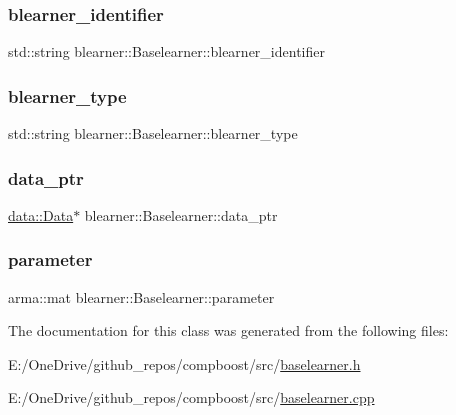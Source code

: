 \subsubsection{\texorpdfstring{blearner\+\_\+identifier}{blearner\_identifier}}
{\footnotesize\ttfamily std\+::string blearner\+::\+Baselearner\+::blearner\+\_\+identifier\hspace{0.3cm}{\ttfamily [protected]}}

\mbox{\label{classblearner_1_1_baselearner_aed6406144af33850b3cb9222dddf3f57}} 
\subsubsection{\texorpdfstring{blearner\+\_\+type}{blearner\_type}}
{\footnotesize\ttfamily std\+::string blearner\+::\+Baselearner\+::blearner\+\_\+type\hspace{0.3cm}{\ttfamily [protected]}}

\mbox{\label{classblearner_1_1_baselearner_a5b5cfab411ff94a13bcce4ca0dd4e507}} 
\subsubsection{\texorpdfstring{data\+\_\+ptr}{data\_ptr}}
{\footnotesize\ttfamily \mbox{\hyperlink{classdata_1_1_data}{data\+::\+Data}}$\ast$ blearner\+::\+Baselearner\+::data\+\_\+ptr\hspace{0.3cm}{\ttfamily [protected]}}

\mbox{\label{classblearner_1_1_baselearner_a56e401f574b274d65e364493277f3247}} 
\subsubsection{\texorpdfstring{parameter}{parameter}}
{\footnotesize\ttfamily arma\+::mat blearner\+::\+Baselearner\+::parameter\hspace{0.3cm}{\ttfamily [protected]}}



The documentation for this class was generated from the following files\+:\begin{DoxyCompactItemize}
\item 
E\+:/\+One\+Drive/github\+\_\+repos/compboost/src/\mbox{\hyperlink{baselearner_8h}{baselearner.\+h}}\item 
E\+:/\+One\+Drive/github\+\_\+repos/compboost/src/\mbox{\hyperlink{baselearner_8cpp}{baselearner.\+cpp}}\end{DoxyCompactItemize}
